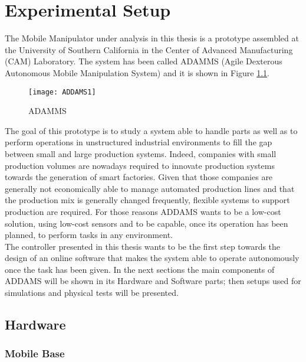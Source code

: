 
\chapter{Experimental Setup}
\label{chapter6}

The Mobile Manipulator under analysis in this thesis is a prototype assembled at the University of Southern California in the Center of Advanced Manufacturing (CAM) Laboratory. The system has been called ADAMMS (Agile  Dexterous  Autonomous  Mobile Manipulation System) and it is shown in Figure \ref{imgADDAMS1}.

\begin{figure}[h!] 
\texttt{[image: ADDAMS1]}
\centering
\caption{ADAMMS}
\label{imgADDAMS1}
\end{figure}

The goal of this prototype is to study a system able to handle parts as well as to perform operations in unstructured industrial environments to fill the gap between small and large production systems. Indeed, companies with small production volumes are nowadays required to innovate production systems towards the generation of smart factories. Given that those companies are generally not economically able to manage automated production lines and that the production mix is generally changed frequently, flexible systems to support production are required. For those reasons ADDAMS wants to be a low-cost solution, using low-cost sensors and to be capable, once its operation has been planned, to perform tasks in any environment. \\


The controller presented in this thesis wants to be the first step towards the design of an online software that makes the system able to operate autonomously once the task has been given. In the next sections the main components of ADDAMS will be shown in its Hardware and Software parts; then setups used for simulations and physical tests will be presented. 
\section{Hardware}

\subsection{Mobile Base}

